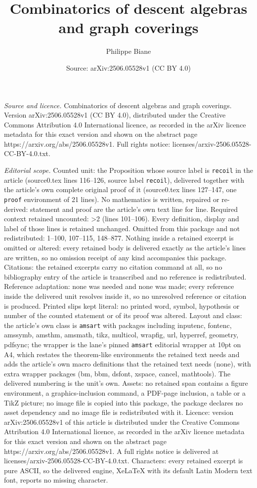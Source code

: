 \documentclass[10pt,a4paper]{amsart}
\title[Combinatorics of descent algebras and graph coverings]{Combinatorics of descent algebras and graph coverings}
\author{Philippe Biane}
\date{Source: arXiv:2506.05528v1 (CC BY 4.0)}
\begin{document}
\maketitle

\noindent\emph{Source and licence.} Combinatorics of descent algebras and graph coverings. Version arXiv:2506.05528v1 (CC BY 4.0), distributed under the Creative Commons Attribution 4.0 International licence, as recorded in the arXiv licence metadata for this exact version and shown on the abstract page https://arxiv.org/abs/2506.05528v1. Full rights notice: licenses/arxiv-2506.05528-CC-BY-4.0.txt.\par\smallskip

\noindent\textit{Editorial scope.} Counted unit: the Proposition whose source label is \texttt{recoil} in the article (source0.tex lines 116--126, source label \texttt{recoil}), delivered together with the article's own complete original proof of it (source0.tex lines 127--147, one \texttt{proof} environment of 21 lines). No mathematics is written, repaired or re-derived: statement and proof are the article's own text line for line. Required context retained uncounted: >2 (lines 101--106). Every definition, display and label of those lines is retained unchanged. Omitted from this package and not redistributed: 1--100, 107--115, 148--877. Nothing inside a retained excerpt is omitted or altered: every retained body is delivered exactly as the article's lines are written, so no omission receipt of any kind accompanies this package. Citations: the retained excerpts carry no citation command at all, so no bibliography entry of the article is transcribed and no reference is redistributed. Reference adaptation: none was needed and none was made; every reference inside the delivered unit resolves inside it, so no unresolved reference or citation is produced. Printed slips kept literal: no printed word, symbol, hypothesis or number of the counted statement or of its proof was altered. Layout and class: the article's own class is \texttt{amsart} with packages including inputenc, fontenc, amssymb, amsthm, amsmath, tikz, multicol, wrapfig, url, hyperref, geometry, pdfsync; the wrapper is the lane's pinned \texttt{amsart} editorial wrapper at 10pt on A4, which restates the theorem-like environments the retained text needs and adds the article's own macro definitions that the retained text needs (none), with extra wrapper packages (bm, bbm, dsfont, xspace, cancel, mathtools). The delivered numbering is the unit's own. Assets: no retained span contains a figure environment, a graphics-inclusion command, a PDF-page inclusion, a table or a TikZ picture; no image file is copied into this package, the package declares no asset dependency and no image file is redistributed with it. Licence: version arXiv:2506.05528v1 of this article is distributed under the Creative Commons Attribution 4.0 International licence, as recorded in the arXiv licence metadata for this exact version and shown on the abstract page https://arxiv.org/abs/2506.05528v1. A full rights notice is delivered at licenses/arxiv-2506.05528-CC-BY-4.0.txt. Characters: every retained excerpt is pure ASCII, so the delivered engine, XeLaTeX with its default Latin Modern text font, reports no missing character.
\end{document}
